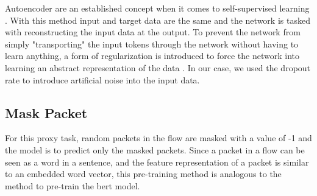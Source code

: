 Autoencoder are an established concept when it comes to self-supervised learning . With this method input and target data are the same and the network is tasked with reconstructing the input data at the output. To prevent the network from simply "transporting" the input tokens through the network without having to learn anything, a form of regularization is introduced to force the network into learning an abstract representation of the data \cite{autoencoders}. 
In our case, we used the dropout rate to introduce artificial noise into the input data.

\subsection{Mask Packet}

For this proxy task, random packets in the flow are masked with a value of -1 and the model is to predict only the masked packets. Since a packet in a flow can be seen as a word in a sentence, and the feature representation of a packet is similar to an embedded word vector, this pre-training method is analogous to the method to pre-train the \gls{bert} model. 

\newpage
